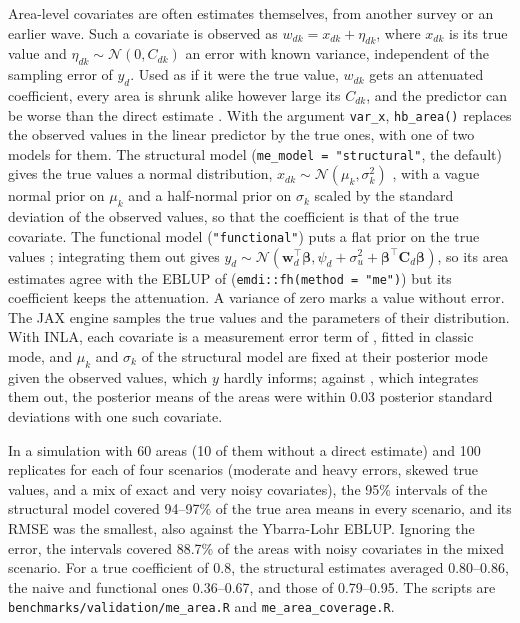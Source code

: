 Area-level covariates are often estimates themselves, from another survey or an earlier wave. Such a covariate is observed as \(w_{dk} = x_{dk} + \eta_{dk}\), where \(x_{dk}\) is its true value and \(\eta_{dk} \sim \mathcal{N}(0, C_{dk})\) an error with known variance, independent of the sampling error of \(y_d\). Used as if it were the true value, \(w_{dk}\) gets an attenuated coefficient, every area is shrunk alike however large its \(C_{dk}\), and the predictor can be worse than the direct estimate \citep{ybarra2008small}. With the argument \texttt{var\_x}, \texttt{hb\_area()} replaces the observed values in the linear predictor by the true ones, with one of two models for them. The structural model (\texttt{me\_model\ =\ "structural"}, the default) gives the true values a normal distribution, \(x_{dk} \sim \mathcal{N}(\mu_k, \sigma_k^2)\) \citep{bell2019measurement}, with a vague normal prior on \(\mu_k\) and a half-normal prior on \(\sigma_k\) scaled by the standard deviation of the observed values, so that the coefficient is that of the true covariate. The functional model (\texttt{"functional"}) puts a flat prior on the true values \citep{arima2015bayesian}; integrating them out gives \(y_d \sim \mathcal{N}(\boldsymbol{w}_d^\top\boldsymbol{\beta}, \psi_d + \sigma_u^2 + \boldsymbol{\beta}^\top\boldsymbol{C}_d\boldsymbol{\beta})\), so its area estimates agree with the EBLUP of \citet{ybarra2008small} (\texttt{emdi::fh(method\ =\ "me")}) but its coefficient keeps the attenuation. A variance of zero marks a value without error. The JAX engine samples the true values and the parameters of their distribution. With INLA, each covariate is a measurement error term of \citet{muff2015bayesian}, fitted in classic mode, and \(\mu_k\) and \(\sigma_k\) of the structural model are fixed at their posterior mode given the observed values, which \(y\) hardly informs; against , which integrates them out, the posterior means of the areas were within 0.03 posterior standard deviations with one such covariate.

In a simulation with 60 areas (10 of them without a direct estimate) and 100 replicates for each of four scenarios (moderate and heavy errors, skewed true values, and a mix of exact and very noisy covariates), the 95\% intervals of the structural model covered 94--97\% of the true area means in every scenario, and its RMSE was the smallest, also against the Ybarra-Lohr EBLUP. Ignoring the error, the intervals covered 88.7\% of the areas with noisy covariates in the mixed scenario. For a true coefficient of 0.8, the structural estimates averaged 0.80--0.86, the naive and functional ones 0.36--0.67, and those of \citet{ybarra2008small} 0.79--0.95. The scripts are \texttt{benchmarks/validation/me\_area.R} and \texttt{me\_area\_coverage.R}.

